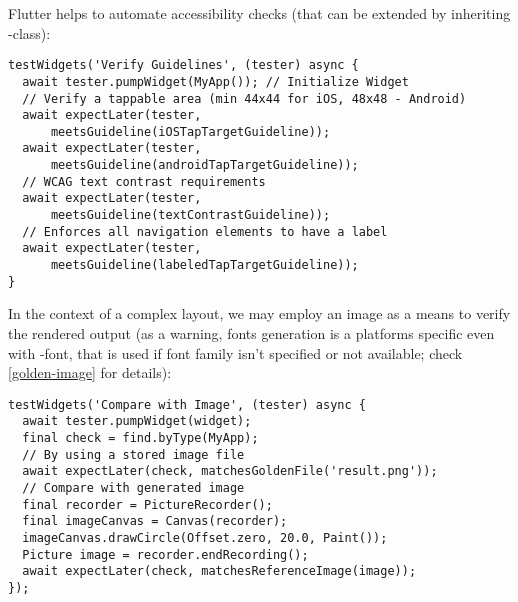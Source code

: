 \noindent Flutter helps to automate accessibility checks (that can be extended by inheriting 
-class):

\begin{lstlisting}
testWidgets('Verify Guidelines', (tester) async {
  await tester.pumpWidget(MyApp()); // Initialize Widget
  // Verify a tappable area (min 44x44 for iOS, 48x48 - Android)
  await expectLater(tester, 
      meetsGuideline(iOSTapTargetGuideline));
  await expectLater(tester, 
      meetsGuideline(androidTapTargetGuideline));
  // WCAG text contrast requirements
  await expectLater(tester, 
      meetsGuideline(textContrastGuideline));
  // Enforces all navigation elements to have a label
  await expectLater(tester,
      meetsGuideline(labeledTapTargetGuideline));
}
\end{lstlisting}

\noindent In the context of a complex layout, we may employ an image as a means to verify the rendered output (as a 
warning, fonts generation is a platforms specific even with -font, that is used if font family isn't 
specified or not available; check \ref{golden-image} for details):

\begin{lstlisting}
testWidgets('Compare with Image', (tester) async {
  await tester.pumpWidget(widget);
  final check = find.byType(MyApp);
  // By using a stored image file
  await expectLater(check, matchesGoldenFile('result.png'));
  // Compare with generated image
  final recorder = PictureRecorder();
  final imageCanvas = Canvas(recorder);
  imageCanvas.drawCircle(Offset.zero, 20.0, Paint());
  Picture image = recorder.endRecording();
  await expectLater(check, matchesReferenceImage(image));
});
\end{lstlisting}
